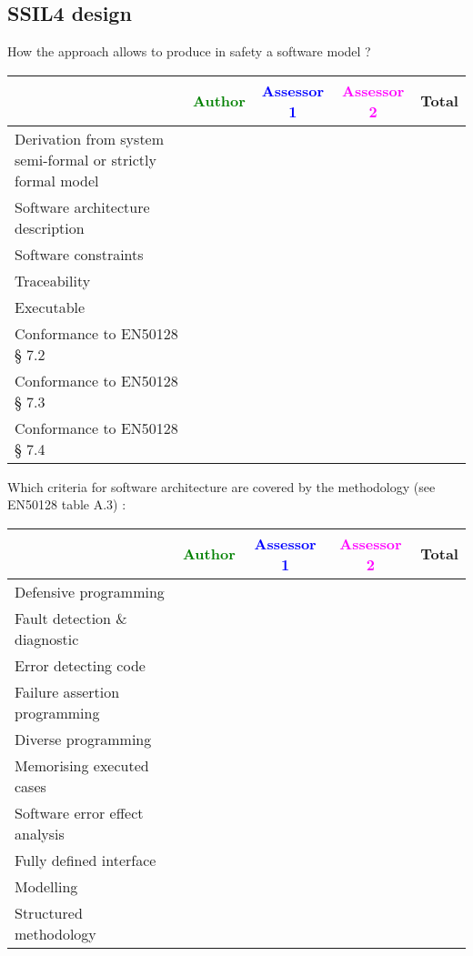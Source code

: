 \begin{author_comment}
\subsection{SSIL4 design}

How the approach allows to  produce in safety a software model ?

\begin{tabular}{|l | c | c | c | c|}
\hline
& \textcolor{green}{Author} & \textcolor{blue}{Assessor 1} & \textcolor{magenta}{Assessor 2} & Total \\
\hline
Derivation from system semi-formal or strictly formal model  & & & &  \\
\hline 
Software architecture description  & & & &  \\
\hline
Software constraints  & & & &  \\
\hline
Traceability  & & & &  \\
\hline
Executable  & & & &  \\
\hline
Conformance to EN50128 § 7.2  & & & &  \\
\hline
Conformance to EN50128 § 7.3  & & & &  \\
\hline
Conformance to EN50128 § 7.4  & & & &  \\
\hline
\end{tabular}

Which criteria for software architecture are covered by the methodology
(see EN50128 table A.3) :

\begin{tabular}{|l | c | c | c | c|}
\hline
& \textcolor{green}{Author} & \textcolor{blue}{Assessor 1} & \textcolor{magenta}{Assessor 2} & Total \\
\hline
Defensive programming  & & & &  \\
\hline 
Fault detection \& diagnostic  & & & &  \\
\hline
Error detecting code  & & & &  \\
\hline
Failure assertion programming & & & &  \\
\hline
Diverse programming & & & &  \\
\hline
Memorising executed cases & & & &  \\
\hline
Software error effect analysis & & & &  \\
\hline
Fully defined interface & & & &  \\
\hline
Modelling  & & & &  \\
\hline
Structured methodology & & & &  \\
\hline
\end{tabular}


\end{author_comment}
